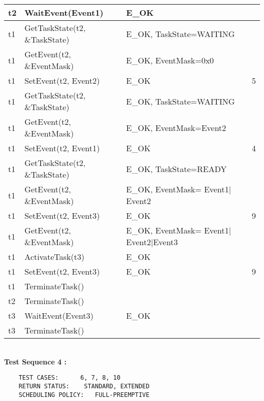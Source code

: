 \documentclass[10pt]{article}
\newlength{\Li}\settowidth{\Li}{Running}
\newlength{\Lii}\setlength{\Lii}{7cm}
\newlength{\Liiii}\setlength{\Liiii}{0.9cm}
\newlength{\Liii}\setlength{\Liii}{\textwidth} \addtolength{\Liii}{-\Li} \addtolength{\Liii}{-\Lii} \addtolength{\Liii}{-\Liiii}
\begin{document}
	\begin{supertabular}{|p{\Li}|p{\Lii}|p{\Liii}|p{\Liiii}|} \hline 
	t2 	& WaitEvent(Event1) 				& E\_OK 								&  \\ \hline
	t1	& GetTaskState(t2, \&TaskState) 		& E\_OK, TaskState=WAITING				& \\ \hline
	t1	& GetEvent(t2, \&EventMask) 			& E\_OK, EventMask=0x0					&  \\ \hline
	t1	& SetEvent(t2, Event2)				& E\_OK 								& 5  \\ \hline
	t1	& GetTaskState(t2, \&TaskState) 		& E\_OK, TaskState=WAITING				&   \\ \hline
	t1 	& GetEvent(t2, \&EventMask) 			& E\_OK, EventMask=Event2				&  \\ \hline
	t1	& SetEvent(t2, Event1)				& E\_OK								& 4  \\ \hline
	t1	& GetTaskState(t2, \&TaskState)		& E\_OK, TaskState=READY				&  \\ \hline
	t1 	& GetEvent(t2, \&EventMask) 			& E\_OK, EventMask= Event1$|$Event2		&  \\ \hline
	t1 	& SetEvent(t2, Event3)				& E\_OK 								& 9 \\ \hline
	t1	& GetEvent(t2, \&EventMask) 			& E\_OK, EventMask= Event1$|$Event2$|$Event3	&   \\ \hline
	t1 	& ActivateTask(t3)					& E\_OK 								& \\ \hline
	t1 	& SetEvent(t2, Event3)				& E\_OK 								& 9\\ \hline
	t1 	& TerminateTask()					&									& \\ \hline
	t2 	& TerminateTask()					&									& \\ \hline
	t3	& WaitEvent(Event3)					& E\_OK								& \\ \hline
	t3 	& TerminateTask()					&									& \\ \hline
	\end{supertabular} \\

	\textbf{Test Sequence 4 :}
	\begin{lstlisting}
	TEST CASES:		 6, 7, 8, 10
	RETURN STATUS:	  STANDARD, EXTENDED 
	SCHEDULING POLICY:   FULL-PREEMPTIVE
	\end{lstlisting}
	
	
\end{document}
